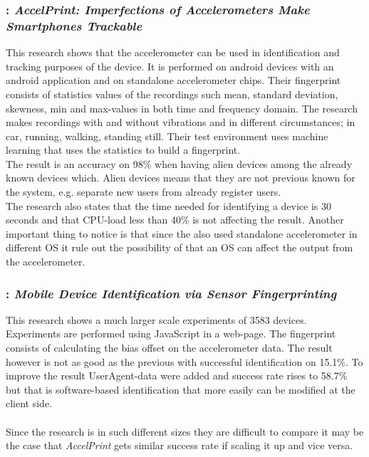 \subsubsection*{\cite[]{sensor:accelPrint}: \textit{AccelPrint: Imperfections of Accelerometers Make Smartphones Trackable}}
This research shows that the accelerometer can be used in identification and tracking purposes of the device. It is performed on android devices with an android application and on standalone accelerometer chips. Their fingerprint consists of statistics values of the recordings such mean, standard deviation, skewness, min and max-values in both time and frequency domain. The research makes recordings with and without vibrations and in different circumstances; in car, running, walking, standing still. Their test environment uses machine learning that uses the statistics to build a fingerprint.\\
The result is an accuracy on 98\% when having alien devices among the already known devices which. Alien devices means that they are not previous known for the system, e.g. separate new users from already register users. \\
The research also states that the time needed for identifying a device is 30 seconds and that CPU-load less than 40\% is not affecting the result. Another important thing to notice is that since the also used standalone accelerometer in different OS it rule out the possibility of that an OS can affect the output from the accelerometer.~\cite[]{sensor:accelPrint}

\subsubsection*{\cite[]{sensor:micSpeak}: \textit{Mobile Device Identification via Sensor Fingerprinting}}
This research shows a much larger scale experiments of 3583 devices. Experiments are performed using JavaScript in a web-page. The fingerprint consists of calculating the bias offset on the accelerometer data. The result however is not as good as the previous with successful identification on 15.1\%. To improve the result UserAgent-data were added and success rate rises to 58.7\% but that is software-based identification that more easily can be modified at the client side.~\cite[]{sensor:micSpeak}\\
\\
Since the research is in such different sizes they are difficult to compare it may be the case that \textit{AccelPrint} gets similar success rate if scaling it up and vice versa. \\
